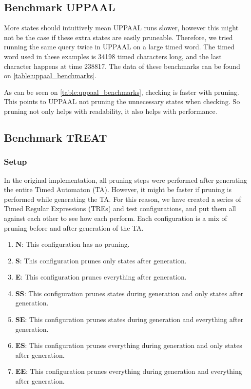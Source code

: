 \subsection{Benchmark UPPAAL}\label{sub:benchmark_uppaal}
More states should intuitively mean UPPAAL runs slower, however this might not be the case if these extra states are easily pruneable.
Therefore, we tried running the same query twice in UPPAAL on a large timed word.
The timed word used in these examples is 34198 timed characters long, and the last character happens at time 238817.
The data of these benchmarks can be found on \cref{table:uppaal_benchmarks}.

\vspace{0.75em}

\vspace{0.75em}

As can be seen on \cref{table:uppaal_benchmarks}, checking is faster with pruning.
This points to UPPAAL not pruning the unnecessary states when checking.
So pruning not only helps with readability, it also helps with performance.

\subsection{Benchmark TREAT}\label{sub:benchmark_treat}
\subsubsection{Setup}
In the original implementation, all pruning steps were performed after generating the entire Timed Automaton (TA).
However, it might be faster if pruning is performed while generating the TA.
For this reason, we have created a series of Timed Regular Expressions (TREs) and test configurations, and put them all against each other to see how each perform.
Each configuration is a mix of pruning before and after generation of the TA.

\vspace{0.75em}
\begin{enumerate}
    \setlength\itemsep{0.5em}
    \item \textbf{N}: This configuration has no pruning.
    \item \textbf{S}: This configuration prunes only states after generation.
    \item \textbf{E}: This configuration prunes everything after generation.
    \item \textbf{SS}: This configuration prunes states during generation and only states after generation.
    \item \textbf{SE}: This configuration prunes states during generation and everything after generation.
    \item \textbf{ES}: This configuration prunes everything during generation and only states after generation.
    \item \textbf{EE}: This configuration prunes everything during generation and everything after generation.
\end{enumerate}
\vspace{0.75em}

